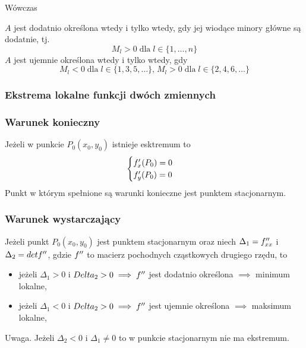 \documentclass[../Matematyka.tex]{subfiles}
\begin{document}
    Wówczas\par
    \(A\) jest dodatnio określona wtedy i tylko wtedy, gdy jej wiodące minory główne są dodatnie, tj.
    \[M_l > 0\;\text{dla}\;l \in \{1,\dots,n\}\]
    \(A\) jest ujemnie określona wtedy i tylko wtedy, gdy 
    \[M_l < 0\;\text{dla}\;l \in \{1, 3, 5, \dots\}\text{,}\; M_l > 0\;\text{dla}\;l \in \{2, 4, 6, \dots\}\]

    \subsubsection{Ekstrema lokalne funkcji dwóch zmiennych}
    \subsubsection*{Warunek konieczny}
    Jeżeli w punkcie \(P_0(x_0, y_0)\) istnieje esktremum to 
    \begin{displaymath}
        \begin{cases}
            f^\prime_x(P_0) = 0 \\
            f^\prime_y(P_0) = 0
        \end{cases}
    \end{displaymath}
    Punkt w którym spełnione są warunki konieczne jest punktem stacjonarnym.

    \subsubsection*{Warunek wystarczający}
    Jeżeli punkt \(P_0(x_0, y_0)\) jest punktem stacjonarnym oraz niech \(\Delta_1=f^{\prime\prime}_{xx}\) i \(\Delta_2=detf^{\prime\prime}\), gdzie \(f^{\prime\prime}\) to macierz pochodnych cząstkowych drugiego rzędu, to
    \begin{itemize}
        \item jeżeli \(\Delta_1 > 0\) i \(Delta_2 > 0 \implies f^{\prime\prime}\) jest dodatnio określona \(\implies\) minimum lokalne,
        \item jeżeli \(\Delta_1 < 0\) i \(Delta_2 > 0 \implies f^{\prime\prime}\) jest ujemnie określona \(\implies\) maksimum lokalne,
    \end{itemize}

    Uwaga. Jeżeli \(\Delta_2 < 0\) i \(\Delta_1 \neq 0\) to w punkcie stacjonarnym nie ma ekstremum.
\end{document}
